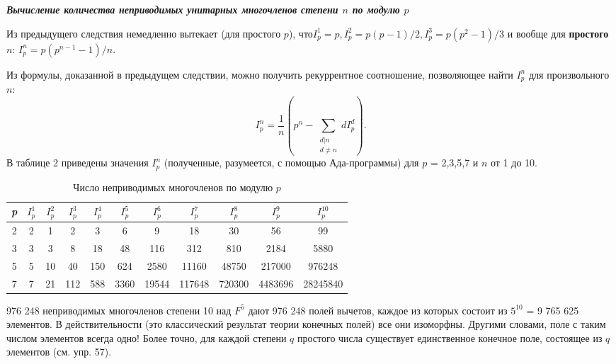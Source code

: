 \noindent\textbf{\textit{Вычисление количества неприводимых унитарных\newline 
многочленов степени $n$ по модулю $p$ }}

Из предыдущего следствия немедленно вытекает (для простого $p$), 
что\linebreak $I^1_p = p, I^2_p = p(p - 1)\slash2, I^3_p = p(p^2 - 1)\slash3$ и вообще для  \textbf{простого} $n$:\linebreak 
$I^n_p = p(p^{n-1} - 1)\slash n$. 

Из формулы, доказанной в предыдущем следствии, можно получить 
рекуррентное соотношение, позволяющее найти $I^n_p$ для  
произвольного $n$: 
\begin{equation*}
I^n_p = \frac{1}{n}(p^n - \sum_{\substack{d|n\\d\neq n}}dI^d_p).
\end{equation*}
В таблице 2 приведены значения $I^n_p$ (полученные, разумеется, с  
помощью Ада-программы) для $p$ = 2,3,5,7 и $n$ от 1 до 10. 

\begin{table}[h!]
\centering
\label{}
\begin{small}
\begin{tabular}{|c|cccccccccc|}
\hline
\textit{p} & $I^1_p$ & $I^2_p$ & $I^3_p$ & $I^4_p$ & $I^5_p$ & $I^6_p$ & $I^7_p$  & $I^8_p$  & $I^9_p$   & $I^{10}_p$   \\ \hline
2          & 2     & 1     & 2     & 3     & 6     & 9     & 18     & 30     & 56      & 99       \\
3          & 3     & 3     & 8     & 18    & 48    & 116   & 312    & 810    & 2184    & 5880     \\
5          & 5     & 10    & 40    & 150   & 624   & 2580  & 11160  & 48750  & 217000  & 976248   \\
7          & 7     & 21    & 112   & 588   & 3360  & 19544 & 117648 & 720300 & 4483696 & 28245840 \\ \hline
\end{tabular}
\end{small}
\caption{Число неприводимых многочленов по модулю $p$} 
\end{table}

\begin{mynotice}
976 248 неприводимых многочленов степени 10 над 
$F^5$ дают 976 248 полей вычетов, каждое из которых состоит из\linebreak 
$5^{10}$ = 9 765 625 элементов. В действительности (это классический 
результат теории конечных полей) все они изоморфны. Другими 
словами, поле с таким числом элементов всегда одно! Более точно, 
для каждой степени $q$ простого числа существует единственное 
конечное поле, состоящее из $q$ элементов (см. упр. 57).\newline 
\end{mynotice}

